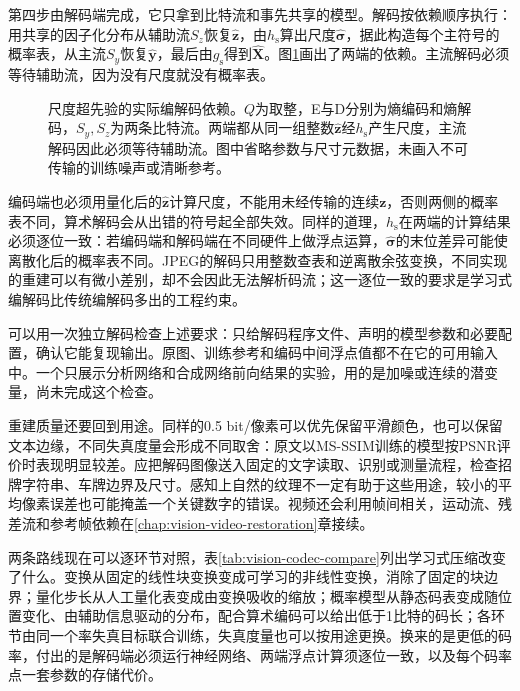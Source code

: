 第四步由解码端完成，它只拿到比特流和事先共享的模型。解码按依赖顺序执行：用共享的因子化分布从辅助流$S_z$恢复$\hat{\bm{z}}$，由$h_{\mathrm{s}}$算出尺度$\hat{\bm{\sigma}}$，据此构造每个主符号的概率表，从主流$S_y$恢复$\hat{\bm{y}}$，最后由$g_{\mathrm{s}}$得到$\widehat{\bm{X}}$。图\ref{fig:vision-hyperprior-codec}画出了两端的依赖。主流解码必须等待辅助流，因为没有尺度就没有概率表。

\begin{figure}[tbp]
 \centering
 
 \caption{尺度超先验的实际编解码依赖。$Q$为取整，E与D分别为熵编码和熵解码，$S_y,S_z$为两条比特流。两端都从同一组整数$\hat{\bm{z}}$经$h_{\mathrm{s}}$产生尺度，主流解码因此必须等待辅助流。图中省略参数与尺寸元数据，未画入不可传输的训练噪声或清晰参考。}
 \label{fig:vision-hyperprior-codec}
\end{figure}
\FloatBarrier

编码端也必须用量化后的$\hat{\bm{z}}$计算尺度，不能用未经传输的连续$\bm{z}$，否则两侧的概率表不同，算术解码会从出错的符号起全部失效。同样的道理，$h_{\mathrm{s}}$在两端的计算结果必须逐位一致：若编码端和解码端在不同硬件上做浮点运算，$\hat{\bm{\sigma}}$的末位差异可能使离散化后的概率表不同。JPEG的解码只用整数查表和逆离散余弦变换，不同实现的重建可以有微小差别，却不会因此无法解析码流；这一逐位一致的要求是学习式编解码比传统编解码多出的工程约束。

可以用一次独立解码检查上述要求：只给解码程序文件、声明的模型参数和必要配置，确认它能复现输出。原图、训练参考和编码中间浮点值都不在它的可用输入中。一个只展示分析网络和合成网络前向结果的实验，用的是加噪或连续的潜变量，尚未完成这个检查。

重建质量还要回到用途。同样的0.5 bit/像素可以优先保留平滑颜色，也可以保留文本边缘，不同失真度量会形成不同取舍：原文以MS-SSIM训练的模型按PSNR评价时表现明显较差。应把解码图像送入固定的文字读取、识别或测量流程，检查招牌字符串、车牌边界及尺寸。感知上自然的纹理不一定有助于这些用途，较小的平均像素误差也可能掩盖一个关键数字的错误。视频还会利用帧间相关，运动流、残差流和参考帧依赖在\ref{chap:vision-video-restoration}章接续。

两条路线现在可以逐环节对照，表\ref{tab:vision-codec-compare}列出学习式压缩改变了什么。变换从固定的线性块变换变成可学习的非线性变换，消除了固定的块边界；量化步长从人工量化表变成由变换吸收的缩放；概率模型从静态码表变成随位置变化、由辅助信息驱动的分布，配合算术编码可以给出低于1比特的码长；各环节由同一个率失真目标联合训练，失真度量也可以按用途更换。换来的是更低的码率，付出的是解码端必须运行神经网络、两端浮点计算须逐位一致，以及每个码率点一套参数的存储代价。

